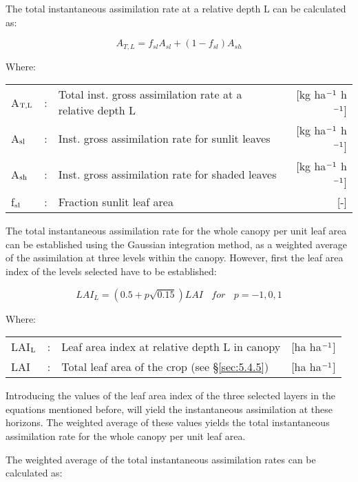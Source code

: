 The total instantaneous assimilation rate at a relative depth L can be calculated as:

\begin{equation}
\label{eq:5.28}
A_{T,L} = f_{sl} A_{sl} + (1 - f_{sl}) A_{sh} 
\end{equation}

Where:\\[5pt]
\begin{tabularx}{\textwidth}{llXr}
	A$_{{\rm T,L}}$ &:& Total inst. gross assimilation rate at a relative depth L   &
	[kg ha$^{{\rm -1}}$ h$^{{\rm -1}}$]\\
	A$_{{\rm sl}}$ &:& Inst. gross assimilation rate for sunlit leaves  & 
	[kg ha$^{{\rm -1}}$ h$^{{\rm -1}}$]\\
	A$_{{\rm sh}}$ &:& Inst. gross assimilation rate for shaded leaves  & 
	[kg ha$^{{\rm -1}}$ h$^{{\rm -1}}$]\\
	f$_{{\rm sl}}$ &:& Fraction sunlit leaf area  &  [-]\\
\end{tabularx}

The total instantaneous assimilation rate for the whole canopy per unit leaf area can be
established using the Gaussian integration method, as a weighted average of the assimilation 
at three levels within the canopy.
However, first the leaf area index of the levels selected have to be established:

\begin{equation}
\label{eq:5.29}
LAI_{L} = (0.5+p \sqrt{0.15})LAI~~~~for~~~~p=-1,0,1
\end{equation}

Where:\\[5pt]
\begin{tabularx}{\textwidth}{llXr}
	LAI$_{{\rm L}}$ &:& Leaf area index at relative depth L in canopy    &    [ha ha$^{{\rm -1}}$]\\
	LAI &:& Total leaf area of the crop (see \S \ref{sec:5.4.5}) &   [ha ha$^{{\rm -1}}$]\\
\end{tabularx}

Introducing the values of the leaf area index of the three selected layers in the equations
mentioned before, will yield the instantaneous assimilation at these horizons. The
weighted average of these values yields the total instantaneous assimilation rate for the
whole canopy per unit leaf area.

The weighted average of the total instantaneous assimilation rates can be calculated as:

